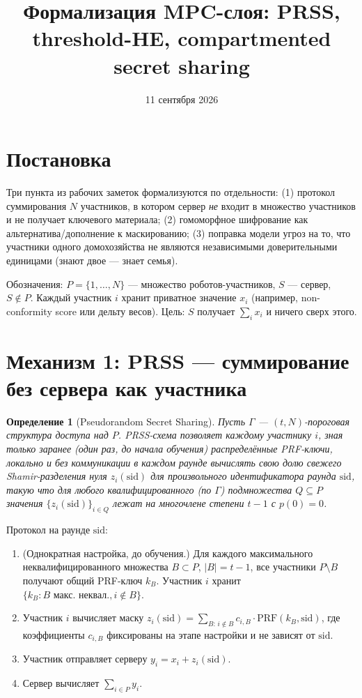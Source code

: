 \documentclass[11pt]{article}
\title{Формализация MPC-слоя: PRSS, threshold-HE, compartmented secret sharing}
\author{}
\date{11 сентября 2026}
\newtheorem{definition}{Определение}
\begin{document}
\maketitle

\section{Постановка}

Три пункта из рабочих заметок формализуются по отдельности: (1) протокол суммирования
$N$ участников, в котором сервер \emph{не} входит в множество участников и не
получает ключевого материала; (2) гомоморфное шифрование как альтернатива/дополнение
к маскированию; (3) поправка модели угроз на то, что участники одного домохозяйства
не являются независимыми доверительными единицами (\guillemotleft знают двое —
знает семья\guillemotright).

Обозначения: $P = \{1,\dots,N\}$ — множество роботов-участников, $S$ — сервер,
$S \notin P$. Каждый участник $i$ хранит приватное значение $x_i$ (например,
non-conformity score или дельту весов). Цель: $S$ получает $\sum_i x_i$ и ничего
сверх этого.

\section{Механизм 1: PRSS — суммирование без сервера как участника}

\begin{definition}[Pseudorandom Secret Sharing]
Пусть $\Gamma$ — $(t,N)$-пороговая структура доступа над $P$. PRSS-схема
\cite{prss2005} позволяет каждому участнику $i$, зная только заранее (один раз, до
начала обучения) распределённые PRF-ключи, локально и без коммуникации в каждом
раунде вычислять свою долю свежего Shamir-разделения нуля $z_i(\mathrm{sid})$ для
произвольного идентификатора раунда $\mathrm{sid}$, такую что для любого
квалифицированного (по $\Gamma$) подмножества $Q\subseteq P$ значения
$\{z_i(\mathrm{sid})\}_{i\in Q}$ лежат на многочлене степени $t-1$ с $p(0)=0$.
\end{definition}

Протокол на раунде $\mathrm{sid}$:
\begin{enumerate}
  \item (Однократная настройка, до обучения.) Для каждого максимального
        неквалифицированного множества $B\subset P$, $|B|=t-1$, все участники
        $P\setminus B$ получают общий PRF-ключ $k_B$. Участник $i$ хранит
        $\{k_B : B \text{ макс.\ неквал.}, i\notin B\}$.
  \item Участник $i$ вычисляет маску
        $z_i(\mathrm{sid}) = \sum_{B:\,i\notin B} c_{i,B}\cdot \mathrm{PRF}(k_B,\mathrm{sid})$,
        где коэффициенты $c_{i,B}$ фиксированы на этапе настройки и не зависят от
        $\mathrm{sid}$.
  \item Участник отправляет серверу $y_i = x_i + z_i(\mathrm{sid})$.
  \item Сервер вычисляет $\sum_{i\in P} y_i$.
\end{enumerate}
\end{document}
